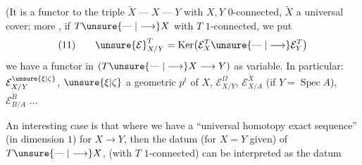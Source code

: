 
(It is a functor  to the triple $\widetilde X\mathrel{\text{---}}X\mathrel{\text{---}}Y$ with $X,Y$ $0$-connected, $\widetilde X$ a universal cover; more , if $T\unsure{\mathrel{\text{---}}|\longrightarrow}X$ with $T$ $1$-connected, we put
\[
(11)\qquad \unsure{\mathcal E}_{X/Y}^{T}=\operatorname{Ker}\bigl(\mathcal E_X^{T}\unsure{\mathrel{\text{---}}|\longrightarrow}\mathcal E_Y^{T}\bigr)
\]
we have a functor in  $(T\unsure{\mathrel{\text{---}}|\longrightarrow}X\longrightarrow Y)$ as variable. In particular: $\mathcal E_{X/Y}^{\unsure{\xi|\zeta}}$, $\unsure{\xi|\zeta}$ a geometric $p^t$ of $X$, $\mathcal E_{X/Y}^{\Omega}$, $\mathcal E_{X/A}^{\widetilde X}$ (if $Y=\operatorname{Spec} A$), $\mathcal E_{B/A}^{\widetilde B}$ $\ldots$


An interesting case is that where we have a ``universal homotopy exact sequence''  (in dimension $1$) for $X\longrightarrow Y$, then the datum (for $X=Y$ given) of $T\unsure{\mathrel{\text{---}}|\longrightarrow}X$, (with $T$ $1$-connected) can be interpreted as the datum  

